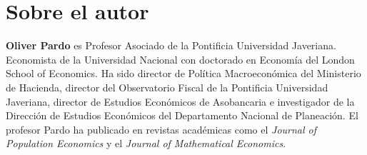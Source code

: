 \documentclass[12pt]{wileySev20250618}
\begin{document}
\printglossary[type=\acronymtype, title={Acrónimos}]

\newpage
\thispagestyle{empty}

\section*{Sobre el autor}

\noindent
\textbf{Oliver Pardo} es Profesor Asociado de la Pontificia Universidad Javeriana. Economista de la Universidad Nacional con doctorado en Economía del London School of Economics. Ha sido director de Política Macroeconómica del Ministerio de Hacienda, director del Observatorio Fiscal de la Pontificia Universidad Javeriana, director de Estudios Económicos de Asobancaria e investigador de la Dirección de Estudios Económicos del Departamento Nacional de Planeación. El profesor Pardo ha publicado en revistas académicas como el \textit{Journal of Population Economics} y el \textit{Journal of Mathematical Economics}.
\end{document}
